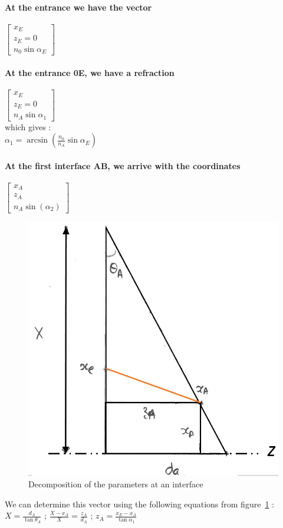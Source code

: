\paragraph*{At the entrance we have the vector}
$\begin{bmatrix}x_E \\ z_E = 0 \\ n_0\sin\alpha_E\end{bmatrix}$
 
\paragraph*{At the entrance 0E, we have a refraction}
$\begin{bmatrix}x_E \\ z_E = 0 \\ n_A\sin\alpha_1\end{bmatrix}$\\

which gives :\\

$\alpha_1 = \arcsin\left(\frac{n_0}{n_A}\sin\alpha_E\right) $

\paragraph*{At the first interface AB, we arrive with the coordinates}

$\begin{bmatrix}x_A \\ z_A \\ n_A\sin\left(\alpha_2\right)\end{bmatrix}$
\begin{figure}[H]
\centering
	\includegraphics[width = .3\textwidth]{images/triangleGeo.png}
	\caption{Decomposition of the parameters at an interface}\label{fig:triangle}
	\centering
\end{figure}
We can determine this vector using the following equations from figure~\ref{fig:triangle} :\\

$X = \frac{d_A}{\tan\theta_A}$ ; $\frac{X-x_A}{X} = \frac{z_A}{d_A}$ ; $z_A = \frac{x_E-x_A}{\tan\alpha_1}$\\

